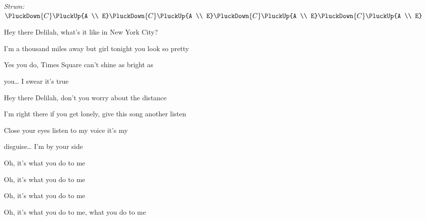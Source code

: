 \begin{song}


\begin{strumbox}
\textit{Strum:} $\PluckDown{C}\PluckUp{A \\ E}\PluckDown{C}\PluckUp{A \\ E}\PluckDown{C}\PluckUp{A \\ E}\PluckDown{C}\PluckUp{A \\ E}$
\end{strumbox}

\begin{vchordbox}
\vspace{2em}
\par
{}\par
{}\par
{}\par
{}\par
\end{vchordbox}

\bigskip

\Intro {}    \par

\bigskip

 Hey there Delilah, what's it like in New York City? \par
I'm a thousand miles away but girl tonight you look so pretty \par
Yes you do,  Times Square can't shine as bright as \par
{}you… I swear it's true \par

\bigskip

 Hey there Delilah, don't you worry about the distance \par
I'm right there if you get lonely, give this song another listen \par
Close your eyes listen to my voice it's my \par
disguise… I'm by your side \par

\bigskip

\begin{chorusbox}{\Chorus}
Oh, it's what you do to me \par
{}Oh, it's what you do to me \par
{}Oh, it's what you do to me \par
{}Oh, it's what you do to me, what you  do to me \par
\end{chorusbox}


\end{song}
